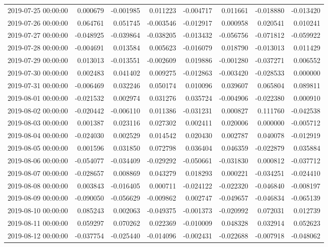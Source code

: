 \begin{tabular}{lrrrrrrr}
2019-07-25 00:00:00 & 0.000679 & -0.001985 & 0.011223 & -0.004717 & 0.011661 & -0.018880 & -0.013420 \\
2019-07-26 00:00:00 & 0.064761 & 0.051745 & -0.003546 & -0.012917 & 0.000958 & 0.020541 & 0.010241 \\
2019-07-27 00:00:00 & -0.048925 & -0.039864 & -0.038205 & -0.013432 & -0.056756 & -0.071812 & -0.059922 \\
2019-07-28 00:00:00 & -0.004691 & 0.013584 & 0.005623 & -0.016079 & 0.018790 & -0.013013 & 0.011429 \\
2019-07-29 00:00:00 & 0.013013 & -0.013551 & -0.002609 & 0.019886 & -0.001280 & -0.037271 & 0.006552 \\
2019-07-30 00:00:00 & 0.002483 & 0.041402 & 0.009275 & -0.012863 & -0.003420 & -0.028533 & 0.000000 \\
2019-07-31 00:00:00 & -0.006469 & 0.032246 & 0.050174 & 0.010096 & 0.039607 & 0.065804 & 0.089811 \\
2019-08-01 00:00:00 & -0.021532 & 0.002974 & 0.031276 & 0.035724 & -0.004906 & -0.022380 & 0.000910 \\
2019-08-02 00:00:00 & -0.020442 & -0.006110 & 0.011386 & -0.031231 & 0.000827 & 0.111760 & -0.042538 \\
2019-08-03 00:00:00 & 0.001387 & 0.023116 & 0.027302 & 0.002411 & 0.020006 & 0.000000 & -0.005712 \\
2019-08-04 00:00:00 & -0.024030 & 0.002529 & 0.014542 & 0.020430 & 0.002787 & 0.040078 & -0.012919 \\
2019-08-05 00:00:00 & 0.001596 & 0.031850 & 0.072798 & 0.036404 & 0.046359 & -0.022879 & 0.035884 \\
2019-08-06 00:00:00 & -0.054077 & -0.034409 & -0.029292 & -0.050661 & -0.031830 & 0.000812 & -0.037712 \\
2019-08-07 00:00:00 & -0.028657 & 0.008869 & 0.043279 & 0.018293 & 0.000221 & -0.034251 & -0.024410 \\
2019-08-08 00:00:00 & 0.003843 & -0.016405 & 0.000711 & -0.024122 & -0.022320 & -0.046840 & -0.008197 \\
2019-08-09 00:00:00 & -0.090050 & -0.056629 & -0.009862 & 0.002747 & -0.049657 & -0.046834 & -0.065139 \\
2019-08-10 00:00:00 & 0.085243 & 0.002063 & -0.049375 & -0.001373 & -0.020992 & 0.072031 & 0.012739 \\
2019-08-11 00:00:00 & 0.059297 & 0.070262 & 0.022369 & -0.010009 & 0.048328 & 0.032914 & 0.052623 \\
2019-08-12 00:00:00 & -0.037754 & -0.025440 & -0.014096 & -0.002431 & -0.022688 & -0.007918 & -0.048062 \\

\end{tabular}
